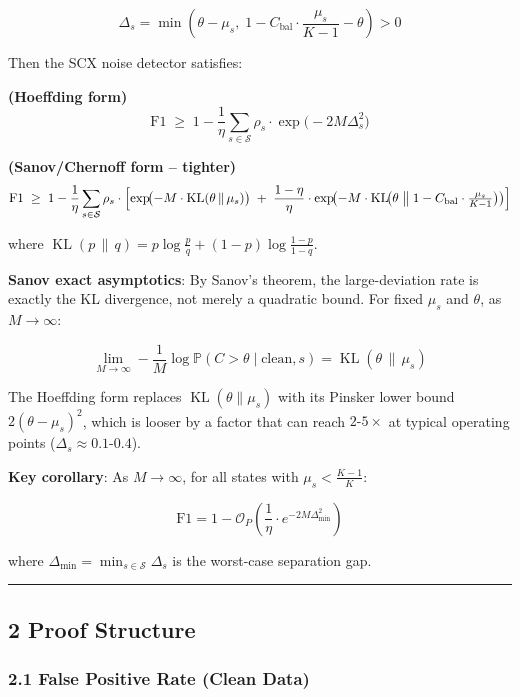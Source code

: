 \documentclass[
  12pt,
]{ctexart}
\begin{document}
\[\Delta_s = \min\left(\theta - \mu_s,\; 1 - C_{\text{bal}} \cdot \frac{\mu_s}{K-1} - \theta\right) > 0\]

Then the SCX noise detector satisfies:

\textbf{(Hoeffding form)}
\[\text{F1} \;\geq\; 1 - \frac{1}{\eta} \sum_{s \in \mathcal{S}} \rho_s \cdot \exp\!\bigl(-2M\Delta_s^2\bigr)\]

\textbf{(Sanov/Chernoff form -- tighter)}
\[\text{F1} \;\geq\; 1 - \frac{1}{\eta} \sum_{s \in \mathcal{S}} \rho_s \cdot \Bigl[ \exp\!\bigl(-M \cdot \operatorname{KL}(\theta \,\|\, \mu_s)\bigr) \;+\; \frac{1-\eta}{\eta} \cdot \exp\!\bigl(-M \cdot \operatorname{KL}\!\bigl(\theta \;\big\|\; 1 - C_{\text{bal}} \cdot \tfrac{\mu_s}{K-1}\bigr)\bigr) \Bigr]\]

where
\(\operatorname{KL}(p \,\|\, q) = p \log\frac{p}{q} + (1-p)\log\frac{1-p}{1-q}\).

\textbf{Sanov exact asymptotics}: By Sanov's theorem, the
large-deviation rate is exactly the KL divergence, not merely a
quadratic bound. For fixed \(\mu_s\) and \(\theta\), as
\(M \to \infty\):

\[\lim_{M \to \infty} -\frac{1}{M} \log \mathbb{P}(C > \theta \mid \text{clean}, s) = \operatorname{KL}(\theta \,\|\, \mu_s)\]

The Hoeffding form replaces \(\operatorname{KL}(\theta \|\mu_s)\) with
its Pinsker lower bound \(2(\theta - \mu_s)^2\), which is looser by a
factor that can reach \(2\text{-}5\times\) at typical operating points
(\(\Delta_s \approx 0.1\text{-}0.4\)).

\textbf{Key corollary}: As \(M \to \infty\), for all states with
\(\mu_s < \frac{K-1}{K}\):

\[\text{F1} = 1 - \mathcal{O}_P\!\left(\frac{1}{\eta} \cdot e^{-2M\Delta_{\min}^2}\right)\]

where \(\Delta_{\min} = \min_{s \in \mathcal{S}} \Delta_s\) is the
worst-case separation gap.

\begin{center}\rule{0.5\linewidth}{0.5pt}\end{center}

\subsection{2 Proof Structure}\label{proof-structure}

\subsubsection{2.1 False Positive Rate (Clean
Data)}\label{false-positive-rate-clean-data}
\end{document}
